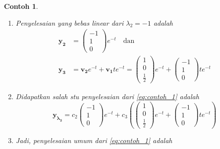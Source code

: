 \documentclass[a4paper]{article}
\theoremstyle{definisi}
\newtheorem{contoh}{Contoh}[section]
\numberwithin{equation}{section}
\begin{document}
\begin{contoh}
\begin{enumerate}[label=Langkah \arabic*: ,leftmargin=*]
      Akibatnya, $v_{3}=\frac{1}{2}$ dan $v_1=1-v_2$. Pilih $v_2=0$ sehingga
      \begin{equation*}
        \mathbf{v_2}=\begin{pmatrix}
          1\\0\\\frac{1}{2}
        \end{pmatrix}
      \end{equation*}
      \item Penyelesaian yang bebas linear dari $\lambda_2=-1$ adalah
      \begin{align*}
        \mathbf{y_2}&=\begin{pmatrix}
          -1\\1\\0
        \end{pmatrix}e^{-t}\quad\text{dan}\\
        \mathbf{y_3}&=\mathbf{v_2}e^{-t}+\mathbf{v_1}te^{-t}
        =\begin{pmatrix}
          1\\0\\\frac{1}{2}
        \end{pmatrix}e^{-t}+\begin{pmatrix}
          -1\\1\\0
        \end{pmatrix}te^{-t}
      \end{align*}
      \item Didapatkan salah stu penyelesaian dari \eqref{eq:contoh_1} adalah
      \begin{equation*}
        \mathbf{y_{\lambda_2}}=c_2\begin{pmatrix}
          -1\\1\\0
        \end{pmatrix}e^{-t}+c_3\left(\begin{pmatrix}
          1\\0\\\frac{1}{2}
        \end{pmatrix}e^{-t}+\begin{pmatrix}
          -1\\1\\0
        \end{pmatrix}te^{-t}\right)
      \end{equation*}
      \item Jadi, penyelesaian umum dari \eqref{eq:contoh_1} adalah
      \begin{equation*}

\end{equation*}
\end{enumerate}
\end{contoh}
\end{document}
